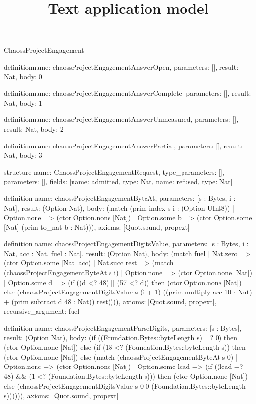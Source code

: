 \begin{lexlean}{ChaossProjectEngagement}
\title{Text application model}
\begin{semanticmodule}
definition{name: chaossProjectEngagementAnswerOpen, parameters: [], result: Nat, body: 0}

definition{name: chaossProjectEngagementAnswerComplete, parameters: [], result: Nat, body: 1}

definition{name: chaossProjectEngagementAnswerUnmeasured, parameters: [], result: Nat, body: 2}

definition{name: chaossProjectEngagementAnswerPartial, parameters: [], result: Nat, body: 3}

structure{
  name: ChaossProjectEngagementRequest,
  type_parameters: [],
  parameters: [],
  fields: [{name: admitted, type: Nat}, {name: refused, type: Nat}]
}

definition{
  name: chaossProjectEngagementByteAt,
  parameters: [s : Bytes, i : Nat],
  result: (Option Nat),
  body: (match (prim index s i : (Option UInt8))
    | Option.none => (ctor Option.none [Nat])
    | Option.some b => (ctor Option.some [Nat] (prim to_nat b : Nat))),
  axioms: [Quot.sound, propext]
}

definition{
  name: chaossProjectEngagementDigitsValue,
  parameters: [s : Bytes, i : Nat, acc : Nat, fuel : Nat],
  result: (Option Nat),
  body: (match fuel
    | Nat.zero => (ctor Option.some [Nat] acc)
    | Nat.succ rest => (match (chaossProjectEngagementByteAt s i)
      | Option.none => (ctor Option.none [Nat])
      | Option.some d => (if ((d <? 48) || (57 <? d)) then (ctor Option.none [Nat]) else (chaossProjectEngagementDigitsValue s (i + 1) ((prim multiply acc 10 : Nat) + (prim subtract d 48 : Nat)) rest)))),
  axioms: [Quot.sound, propext],
  recursive_argument: fuel
}

definition{
  name: chaossProjectEngagementParseDigits,
  parameters: [s : Bytes],
  result: (Option Nat),
  body: (if ((Foundation.Bytes::byteLength s) =? 0) then (ctor Option.none [Nat]) else (if (18 <? (Foundation.Bytes::byteLength s)) then (ctor Option.none [Nat]) else (match (chaossProjectEngagementByteAt s 0)
    | Option.none => (ctor Option.none [Nat])
    | Option.some lead => (if ((lead =? 48) && (1 <? (Foundation.Bytes::byteLength s))) then (ctor Option.none [Nat]) else (chaossProjectEngagementDigitsValue s 0 0 (Foundation.Bytes::byteLength s)))))),
  axioms: [Quot.sound, propext]
}


\end{semanticmodule}
\end{lexlean}

